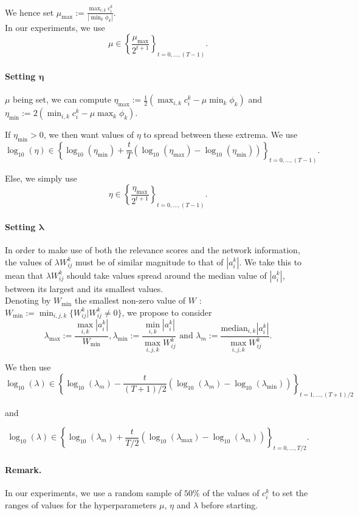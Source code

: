 \documentclass[12pt,a4paper]{article}
\begin{document}
We hence set $\mu_{\max} := \frac{\max_{i, k} c_i^k}{|\min_k \phi_k|}$.\\

In our experiments, we use 
\[ \boxed{
\mu \in \left\{ \frac{\mu_{\max}}{2^{t+1}} \right \}_{t = 0, \dots, (T-1)}}.
\]

\paragraph{Setting $\pmb{\eta}$} $\mu$ being set, we can compute 
$\eta_{\max} := \frac{1}{2} (\max_{i, k} c_i^k - \mu \min_k \phi_k)$ and 
$\eta_{\min} := 2 (\min_{i, k} c_i^k - \mu \max_k \phi_k)$.


If $\eta_{\min} > 0$, we then want values of $\eta$ to spread between these extrema.
We use 
\[\boxed{
\log_{10}(\eta) \in \left \{ {\log_{10}(\eta_{\min}) + \frac{t}{T} \left(\log_{10} \left(\eta_{\max}\right) - \log_{10}(\eta_{\min}) \right)    }   \right \}_{t = 0, \dots, (T-1)}}. 
\]

Else, we simply use 
\[ \boxed{
\eta \in \left \{ \frac{\eta_{\max}}{2^{t+1}} \right \}_{t = 0, \dots, (T-1)}}.
\]

\paragraph{Setting $\pmb{\lambda}$} In order to make use of both the relevance scores and the network information, 
the values of $\lambda W_{ij}^k$ must be of similar magnitude to that of $|a_i^k|$. 
We take this to mean that $\lambda W_{ij}^k$ should take values spread around the median value of $|a_i^k|$,
between its largest and its smallest values.\\

Denoting by $W_{\min}$ the smallest non-zero value of $W$ : 
$W_{\min} := \min_{i, j, k} \{ W_{ij}^k | W_{ij}^k \neq 0\}$,
we propose to consider 
\[
\lambda_{\max} := \frac{\max_{i,k} |a_i^k|}{W_{\min}}, 
\lambda_{\min} := \frac{\min_{i,k} |a_i^k|}{\max_{i,j,k}W_{ij}^k} \mbox{ and }
\lambda_{m} := \frac{\mbox{median}_{i, k} |a_i^k|}{\max_{i,j,k}W_{ij}^k}.
\]

 We then use 
\[\boxed{
\log_{10}(\lambda) \in \left \{ {\log_{10}(\lambda_{m}) - \frac{t}{(T+1)/2} 
 \left (\log_{10}(\lambda_{m}) - \log_{10}(\lambda_{\min}) \right)} \right \}_{t = 1, \dots, (T+1)/2}}
\]

 and

\[\boxed{
\log_{10}(\lambda) \in \left \{ {\log_{10}(\lambda_{m}) + \frac{t}{T/2} 
\left (\log_{10}(\lambda_{\max}) - \log_{10}(\lambda_{m}) \right)} \right \}_{t = 0, \dots, T/2}}.
\]



\paragraph{Remark.} In our experiments, we use a random sample of $50\%$ of the values of $c_i^k$ to set the ranges of values for the hyperparameters $\mu$, $\eta$ and $\lambda$ before starting.




\end{document}
